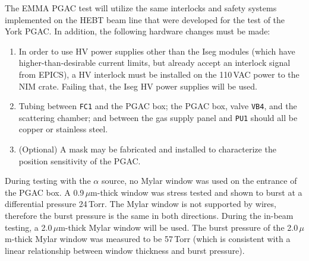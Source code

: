The EMMA PGAC test will utilize the same interlocks and safety systems implemented on the HEBT beam line that were developed for the test of the York PGAC.  In addition, 
the following hardware changes must be made:
\begin{enumerate}
\setlength{\itemsep}{0pt}
\setlength{\parskip}{0pt}
\setlength{\parsep}{0pt}
\item In order to use HV power supplies other than the Iseg modules (which have higher-than-desirable  current limits, but already accept an interlock signal from EPICS), a HV interlock must be installed on the 110\,VAC power to the NIM crate.  Failing that, the Iseg HV power supplies will be used.
\item Tubing between \texttt{FC1} and the PGAC box; the PGAC box, valve \texttt{VB4}, and the scattering chamber; and between
the gas supply panel and \texttt{PU1} should all be copper or stainless steel.
\item (Optional) A mask may be fabricated and installed to characterize the position sensitivity of the PGAC.
\end{enumerate}

During testing with the $\alpha$ source, no Mylar window was used on the entrance of the PGAC box.  A 0.9\,$\mu$m-thick window was stress tested and shown to burst at a differential pressure 24\,Torr.  The Mylar window is not supported by wires, therefore the burst pressure is the same in both directions.  During the in-beam testing, a  2.0\,$\mu$m-thick Mylar window will be used.  
The burst pressure of the 2.0\,$\mu$m-thick Mylar window was measured to be 57\,Torr (which is consistent with a linear relationship between window thickness and burst pressure).

